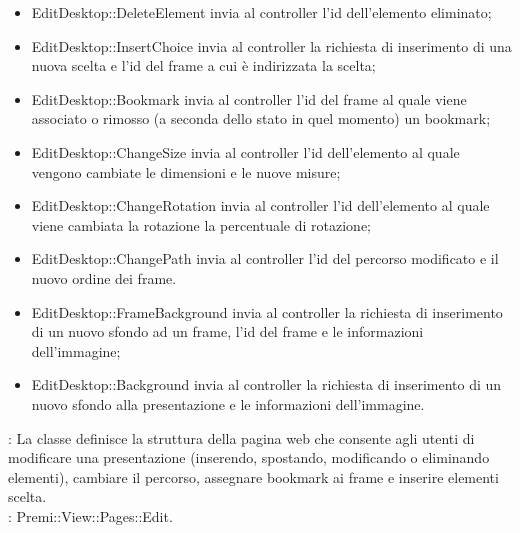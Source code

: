 {{\begin{itemize}
				\item EditDesktop::DeleteElement invia al controller l'id dell'elemento eliminato;
				\item EditDesktop::InsertChoice invia al controller la richiesta di inserimento di una nuova scelta e l'id del frame a cui è indirizzata la scelta;
				\item EditDesktop::Bookmark invia al controller l'id del frame al quale viene associato o rimosso (a seconda dello stato in quel momento) un bookmark;
				\item EditDesktop::ChangeSize invia al controller l'id dell'elemento al quale vengono cambiate le dimensioni e le nuove misure;
				\item EditDesktop::ChangeRotation invia al controller l'id dell'elemento al quale viene cambiata la rotazione la percentuale di rotazione;
				\item EditDesktop::ChangePath invia al controller l'id del percorso modificato e il nuovo ordine dei frame.
				\item EditDesktop::FrameBackground invia al controller la richiesta di inserimento di un nuovo sfondo ad un frame, l'id del frame e le informazioni dell'immagine;
				\item EditDesktop::Background invia al controller la richiesta di inserimento di un nuovo sfondo alla presentazione e le informazioni dell'immagine.
			\end{itemize}
			\textbf{\attivita}: La classe definisce la struttura della pagina web che consente agli utenti di modificare una presentazione (inserendo, spostando, modificando o eliminando elementi), cambiare il percorso, assegnare bookmark ai frame e inserire elementi scelta.\\
			\textbf{\base}: Premi::View::Pages::Edit.
		}
}
